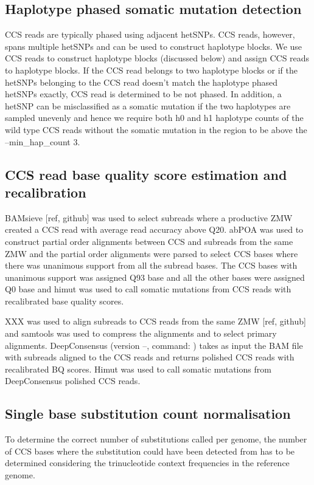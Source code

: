 \subsection{Haplotype phased somatic mutation detection}

CCS reads are typically phased using adjacent hetSNPs. CCS reads, however, spans multiple hetSNPs and can be used to construct haplotype blocks. We use CCS reads to construct haplotype blocks (discussed below) and assign CCS reads to haplotype blocks. If the CCS read belongs to two haplotype blocks or if the hetSNPs belonging to the CCS read doesn’t match the haplotype phased hetSNPs exactly, CCS read is determined to be not phased. In addition, a hetSNP can be misclassified as a somatic mutation if the two haplotypes are sampled unevenly and hence we require both h0 and h1 haplotype counts of the wild type CCS reads without the somatic mutation in the region to be above the --min\_hap\_count 3. 

\subsection{CCS read base quality score estimation and recalibration}

BAMsieve [ref, github] was used to select subreads where a productive ZMW created a CCS read with average read accuracy above Q20. abPOA \cite{Gao2021-nf} was used to construct partial order alignments between CCS and subreads from the same ZMW and the partial order alignments were parsed to select CCS bases where there was unanimous support from all the subread bases. The CCS bases with unanimous support was assigned Q93 base and all the other bases were assigned Q0 base and himut was used to call somatic mutations from CCS reads with recalibrated base quality scores. 

XXX was used to align subreads to CCS reads from the same ZMW [ref, github] and samtools was used to compress the alignments and to select primary alignments. DeepConsensus (version --, command: ) \cite{Baid2022-or} takes as input the BAM file with subreads aligned to the CCS reads and returns polished CCS reads with recalibrated BQ scores. Himut was used to call somatic mutations from DeepConsensus polished CCS reads. 

\subsection{Single base substitution count normalisation}
To determine the correct number of substitutions called per genome, the number of CCS bases where the substitution could have been detected from has to be determined considering the trinucleotide context frequencies in the reference genome.

